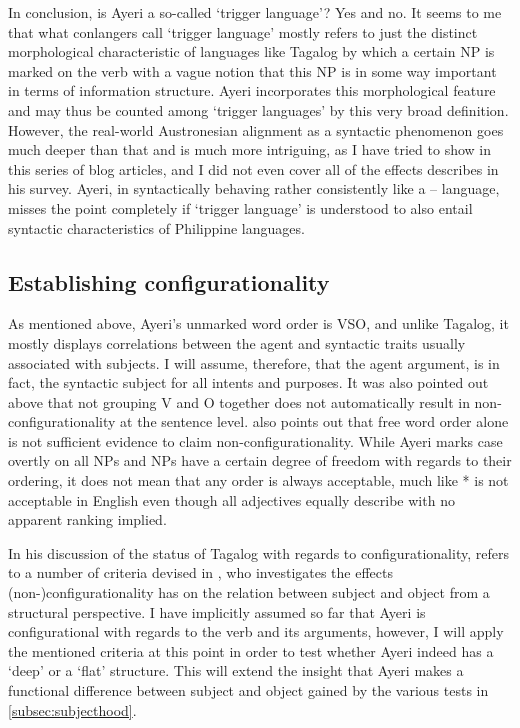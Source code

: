 In conclusion, is Ayeri a so-called `trigger language'? Yes and no. It seems to
me that what conlangers call `trigger language' mostly refers to just the
distinct morphological characteristic of languages like Tagalog by which a
certain NP is marked on the verb with a vague notion that this NP is in some
way important in terms of information structure. Ayeri incorporates this
morphological feature and may thus be counted among `trigger languages' by this
very broad definition. However, the real-world Austronesian alignment as a
syntactic phenomenon goes much deeper than that and is much more intriguing, as
I have tried to show in this series of blog articles, and I did not even cover
all of the effects \citet{kroeger1991} describes in his survey. Ayeri, in
syntactically behaving rather consistently like a \Nom{}--\Acc{} language,
misses the point completely if `trigger language' is understood to also entail
syntactic characteristics of Philippine languages.

\subsection{Establishing configurationality}
\label{subsec:config}

As mentioned above, Ayeri's unmarked word order is VSO, and unlike Tagalog, it
mostly displays correlations between the agent and syntactic traits usually
associated with subjects. I will assume, therefore, that the agent argument, is
in fact, the syntactic subject for all intents and purposes. It was also
pointed out above that not grouping V and O together does not automatically
result in non-configurationality at the sentence level. \citet[128]{speas1990}
also points out that free word order alone is not sufficient evidence to claim
non-configurationality. While Ayeri marks case overtly on all NPs and NPs have
a certain degree of freedom with regards to their ordering, it does not mean
that any order is always acceptable, much like * is not acceptable in English even though all adjectives equally
describe  with no apparent ranking implied.

In his discussion of the status of Tagalog with regards to configurationality,
\citet{kroeger1991} refers to a number of criteria devised in
\citet{speas1990}, who investigates the effects (non-)configurationality has on
the relation between subject and object from a structural perspective. I have
implicitly assumed so far that Ayeri is configurational with regards to the
verb and its arguments, however, I will apply the mentioned criteria at this
point in order to test whether Ayeri indeed has a `deep' or a `flat' structure.
This will extend the insight that Ayeri makes a functional difference between
subject and object gained by the various tests in \autoref{subsec:subjecthood}.

